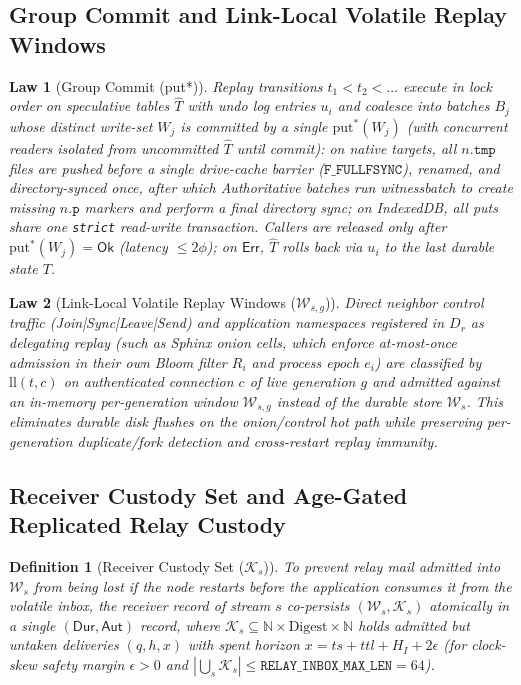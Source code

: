 \documentclass[journal]{IEEEtran}
\newtheorem{definition}{Definition}
\newtheorem{law}{Law}
\DeclareRobustCommand{\code}[1]{{\ttfamily\renewcommand{\_}{\textunderscore\allowbreak}#1}}
\begin{document}
\subsection{Group Commit and Link-Local Volatile Replay Windows}

\begin{law}[Group Commit (\code{put*})]\label{law:group-commit}
Replay transitions $t_1<t_2<\dots$ execute in lock order on speculative tables
$\hat{T}$ with undo log entries $u_i$ and coalesce into batches $B_j$ whose distinct
write-set $W_j$ is committed by
a single $\mathrm{put}^*(W_j)$ (with concurrent readers isolated from uncommitted $\hat{T}$ until commit):
on native targets, all $n.\mathtt{tmp}$ files are
pushed before a single drive-cache barrier ($\mathtt{F\_FULLFSYNC}$), renamed,
and directory-synced once, after which \code{Authoritative} batches run \code{witness\_batch} to create missing $n.\mathtt{p}$ markers and perform a final directory sync;
on IndexedDB, all puts share one \texttt{strict}
read-write transaction.  Callers are released only after $\mathrm{put}^*(W_j)=\mathsf{Ok}$
(latency $\le 2\phi$); on $\mathsf{Err}$, $\hat{T}$ rolls back via $u_i$ to the
last durable state $T$.
\end{law}

\begin{law}[Link-Local Volatile Replay Windows ($\mathcal{W}_{s,g}$)]\label{law:link-local}
Direct neighbor control traffic (\code{Join|Sync|Leave|Send}) and application
namespaces registered in $D_r$ as delegating replay (such as Sphinx onion cells,
which enforce at-most-once admission in their own Bloom filter $R_i$ and process
epoch $e_i$) are classified by $\mathrm{ll}(t,c)$ on authenticated connection
$c$ of live generation $g$ and admitted against an in-memory per-generation
window $\mathcal{W}_{s,g}$ instead of the durable store $\mathcal{W}_s$.
This eliminates durable disk flushes on the onion/control hot path while
preserving per-generation duplicate/fork detection and cross-restart replay
immunity.
\end{law}

\subsection{Receiver Custody Set and Age-Gated Replicated Relay Custody}

\begin{definition}[Receiver Custody Set ($\mathcal{K}_s$)]\label{def:custody-set}
To prevent relay mail admitted into $\mathcal{W}_s$ from being lost if the node
restarts before the application consumes it from the volatile inbox,
the receiver record of stream $s$ co-persists $(\mathcal{W}_s,\mathcal{K}_s)$
atomically in a single $(\mathsf{Dur},\mathsf{Aut})$ record, where
$\mathcal{K}_s\subseteq\mathbb{N}\times\mathrm{Digest}\times\mathbb{N}$ holds
admitted but untaken deliveries $(q,h,x)$ with spent horizon
$x=\mathit{ts}+\mathit{ttl}+H_I+2\epsilon$ (for clock-skew safety margin $\epsilon>0$ and $|\bigcup_s\mathcal{K}_s|\le\mathtt{RELAY\_INBOX\_MAX\_LEN}=64$).
\end{definition}
\end{document}
